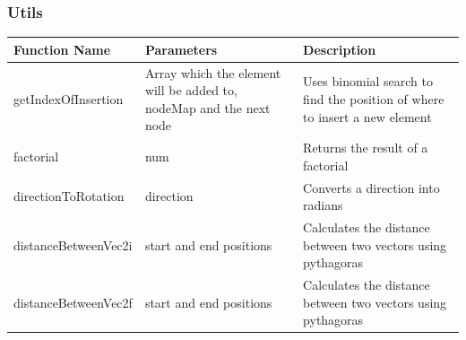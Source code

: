 \documentclass[../Main.tex]{subfiles}
\begin{document}
        \subsubsection{Utils}
        \begin{center}
            \begin{tabular}{ | m{} | m{}| m{} | }
                \hline
                \textbf{Function Name} & \textbf{Parameters} & \textbf{Description} \\
                \hline
                getIndexOfInsertion & Array which the element will be added to, nodeMap and the next node & Uses binomial search to find the position of where to insert a new element \\
                \hline
                factorial & num & Returns the result of a factorial \\
                \hline
                directionToRotation & direction & Converts a direction into radians \\
                \hline
                distanceBetweenVec2i & start and end positions & Calculates the distance between two vectors using pythagoras \\
                \hline
                distanceBetweenVec2f & start and end positions &  Calculates the distance between two vectors using pythagoras\\
                \hline
            \end{tabular}
        \end{center}
\end{document}
